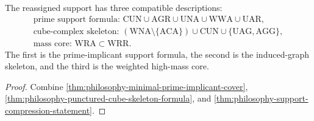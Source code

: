 \begin{theorem}
\label{thm:philosophy-support-skeleton-statement}
The reassigned support has three compatible descriptions:
$$
\begin{gathered}
  \text{prime support formula: }
  \mathrm{CUN}\cup\mathrm{AGR}\cup\mathrm{UNA}
  \cup\mathrm{WWA}\cup\mathrm{UAR},\\
  \text{cube-complex skeleton: }
  (\mathrm{WNA}\setminus\{\mathrm{ACA}\})
  \cup\mathrm{CUN}\cup\{\mathrm{UAG},\mathrm{AGG}\},\\
  \text{mass core: }
  \mathrm{WRA}\subset\mathrm{WRR}.
\end{gathered}
$$
The first is the prime-implicant support formula, the second is the
induced-graph skeleton, and the third is the weighted high-mass core.
\end{theorem}
\begin{proof}
Combine \autoref{thm:philosophy-minimal-prime-implicant-cover},
\autoref{thm:philosophy-punctured-cube-skeleton-formula}, and
\autoref{thm:philosophy-support-compression-statement}.
\end{proof}

